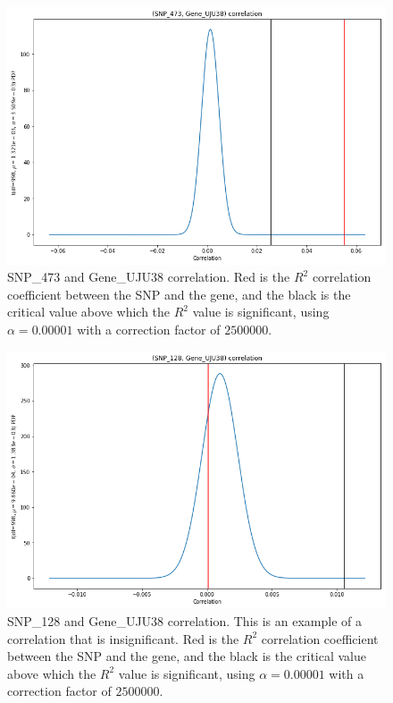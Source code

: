 \documentclass{article}[11pt]
\begin{document}
\begin{figure}[H]
\includegraphics[width=\textwidth]{./imgs/snp_473.png}
\caption{SNP\_473 and Gene\_UJU38 correlation.
Red is the $R^2$ correlation coefficient between the SNP
and the gene, and the black is the critical value above which
the $R^2$ value is significant, using $\alpha=0.00001$ with
a correction factor of $2500000$.}
\end{figure}

\begin{figure}[H]
\includegraphics[width=\textwidth]{./imgs/snp_128.png}
\caption{SNP\_128 and Gene\_UJU38 correlation. This
is an example of a correlation that is insignificant.
Red is the $R^2$ correlation coefficient between the SNP
and the gene, and the black is the critical value above which
the $R^2$ value is significant, using $\alpha=0.00001$ with
a correction factor of $2500000$.}
\end{figure}
\end{document}
